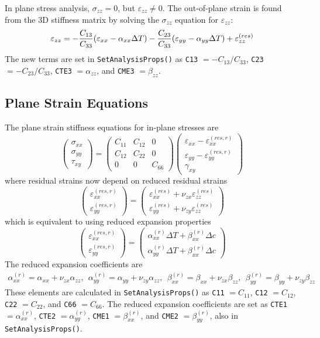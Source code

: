 \documentclass[11pt]{article}
\def\a#1{\alpha_{#1}}
\def\b#1{\beta_{#1}}
\def\code#1{{\small\tt #1}}
\def\DT{\Delta T}
\def\e#1{\varepsilon_{#1}}
\def\er#1{\varepsilon_{#1}^{(res)}}
\def\err#1{\varepsilon_{#1}^{(res,r)}}
\def\g#1{\gamma_{#1}}
\def\s#1{\sigma_{#1}}
\def\symmat#1#2#3#4#5#6{\left(\begin{array}{ccc} #1 & #2 & #3 \\ #2 & #4 & #5 \\
                                                      #3 & #5 & #6 \end{array}\right)}
\def\t#1{\tau_{#1}}
\def\v#1{\nu_{#1}}
\def\vvec#1#2#3{\left(\begin{array}{ccc} #1 \\ #2 \\ #3 \end{array}\right)}
\begin{document}
In plane stress analysis, $\s{zz}=0$, but $\e{zz}\ne0$. The out-of-plane strain is found from the 3D stiffness matrix by solving the $\s{zz}$ equation for $\e{zz}$:
\begin{equation}
            \e{zz} = -{C_{13}\over C_{33}}(\e{xx} -\a{xx}\DT) - {C_{23}\over C_{33}}(\e{yy} -\a{yy}\DT) 
                     + \er{zz}
\end{equation}
The new terms are set in \code{SetAnalysisProps()} as \code{C13} $=-C_{13}/C_{33}$, \code{C23} $=-C_{23}/C_{33}$, \code{CTE3} $=\a{zz}$, and \code{CME3} $=\b{zz}$.

\subsection{Plane Strain Equations}

The plane strain stiffness equations for in-plane stresses are
\begin{equation}
      \vvec{\s{xx}}{\s{yy}}{\t{xy}} = \symmat{C_{11}}{C_{12}}{0}{C_{22}}{0}{C_{66}}
          \vvec{\e{xx} -\err{xx}}{\e{yy} - \err{yy}}{\g{xy}}
 \end{equation}
 where residual strains now depend on reduced residual strains
\begin{equation}
\left(\begin{array}{c} \err{xx} \\ \err{yy}  \end{array}\right)
       =  \left(\begin{array}{c}
	 \er{xx} + \v{zx}\er{zz} \\
	\er{yy} + \v{zy}\er{zz} \end{array}\right)
\end{equation}
which is equivalent to using reduced expansion properties
\begin{equation}
\left(\begin{array}{c} \err{xx} \\ \err{yy}  \end{array}\right)
       =  \left(\begin{array}{c}
	 \a{xx}^{(r)}\DT + \b{xx}^{(r)}\Delta c \\
	\a{yy}^{(r)}\DT + \b{xx}^{(r)}\Delta c \end{array}\right)
\end{equation}
The reduced expansion coefficients are
\begin{eqnarray}%
   \a{xx}^{(r)} = \a{xx} + \v{zx}\a{zz}, \ \ 
   \a{yy}^{(r)} = \a{yy} + \v{zy}\a{zz}, \ \ 
   \b{xx}^{(r)} = \b{xx} + \v{zx}\b{zz}, \ \ 
   \b{yy}^{(r)} = \b{yy} + \v{zy}\b{zz}
\end{eqnarray}%
These elements are calculated in \code{SetAnalysisProps()} as \code{C11} $=C_{11}$, \code{C12}  $=C_{12}$, \code{C22} $=C_{22}$, and \code{C66} $=C_{66}$. The reduced expansion coefficients are set as \code{CTE1} $=\a{xx}^{(r)}$, \code{CTE2} $=\a{yy}^{(r)}$, \code{CME1} $=\b{xx}^{(r)}$, and \code{CME2} $=\b{yy}^{(r)}$, also in \code{SetAnalysisProps()}.
\end{document}
